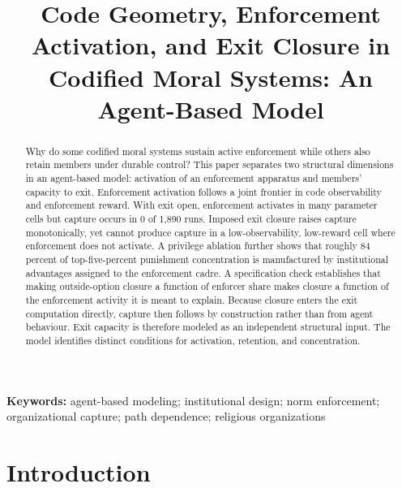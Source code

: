 \documentclass[12pt]{article}
\title{Code Geometry, Enforcement Activation, and Exit Closure in Codified Moral Systems: An Agent-Based Model}
\author{}
\date{}
\date{}
\newcommand{\affiliation}{}
\begin{document}
\maketitle
\vspace{1em}


\begin{abstract}
Why do some codified moral systems sustain active enforcement while others also retain members under durable control? This paper separates two structural dimensions in an agent-based model: activation of an enforcement apparatus and members' capacity to exit. Enforcement activation follows a joint frontier in code observability and enforcement reward. With exit open, enforcement activates in many parameter cells but capture occurs in 0 of 1,890 runs. Imposed exit closure raises capture monotonically, yet cannot produce capture in a low-observability, low-reward cell where enforcement does not activate. A privilege ablation further shows that roughly 84 percent of top-five-percent punishment concentration is manufactured by institutional advantages assigned to the enforcement cadre. A specification check establishes that making outside-option closure a function of enforcer share makes closure a function of the enforcement activity it is meant to explain. Because closure enters the exit computation directly, capture then follows by construction rather than from agent behaviour. Exit capacity is therefore modeled as an independent structural input. The model identifies distinct conditions for activation, retention, and concentration.
\end{abstract}
\vspace{1em}\noindent\textbf{Keywords:} agent-based modeling; institutional design; norm enforcement; organizational capture; path dependence; religious organizations

\newpage


\section{Introduction}
\end{document}

